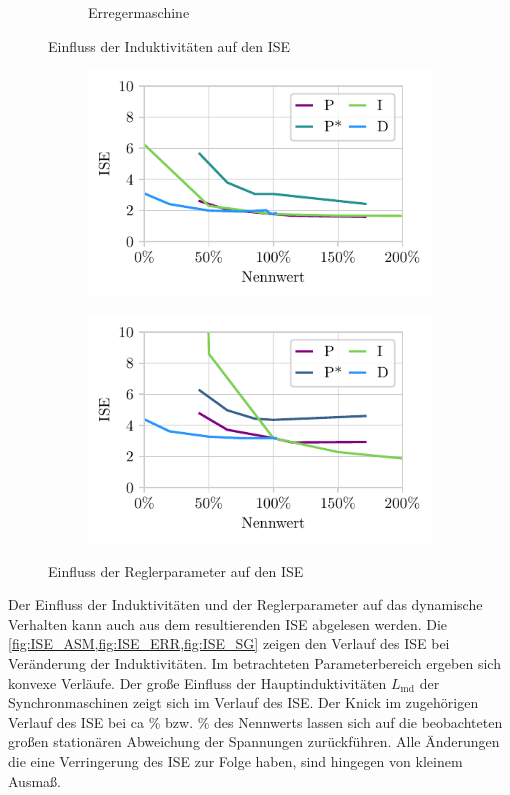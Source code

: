 \begin{figure}
\begin{subfigure}{\textwidth}
        \caption{Erregermaschine }
        \label{fig:ISE_ERR}    
    \end{subfigure}
    \caption{Einfluss der Induktivitäten auf den ISE}
\end{figure}
\begin{figure}
    \centering
    \begin{subfigure}{.49\linewidth}
        \centering
        \includegraphics{Bilder/regler_ISE_korr.pdf}    
    \end{subfigure}
    \begin{subfigure}{.49\linewidth}
        \centering
        \includegraphics{Bilder/simulation_reglerSweep_korr.pdf}
    \end{subfigure}
    \caption{Einfluss der Reglerparameter auf den ISE}
    \label{fig:ISE_ReglerSweep}
\end{figure}

Der Einfluss der Induktivitäten und der Reglerparameter auf das dynamische Verhalten kann auch aus dem resultierenden ISE abgelesen werden. Die \cref{fig:ISE_ASM,fig:ISE_ERR,fig:ISE_SG} zeigen den Verlauf des ISE bei Veränderung der Induktivitäten. Im betrachteten Parameterbereich ergeben sich konvexe Verläufe. Der große Einfluss der Hauptinduktivitäten $L_{\mathrm{md}}$ der Synchronmaschinen zeigt sich im Verlauf des ISE. Der Knick im zugehörigen Verlauf des ISE bei ca \unit[48]{\%} bzw. \unit[33]{\%} des Nennwerts lassen sich auf die beobachteten großen stationären Abweichung der Spannungen zurückführen. Alle Änderungen die eine Verringerung des ISE zur Folge haben, sind hingegen von kleinem Ausmaß.

